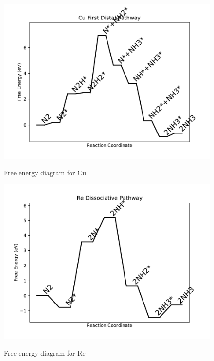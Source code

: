 \documentclass{article}
\begin{document}
\newpage
\begin{figure}
\includegraphics[width=1\linewidth]{data/plots/Cu_distal_1.pdf}
\label{fig:Cu_distal_1}
\caption{Free energy diagram for Cu}
\end{figure}

\begin{figure}
\includegraphics[width=1\linewidth]{data/plots/Re_dissociative.pdf}
\label{fig:Re_dissociative}
\caption{Free energy diagram for Re}
\end{figure}
\end{document}
